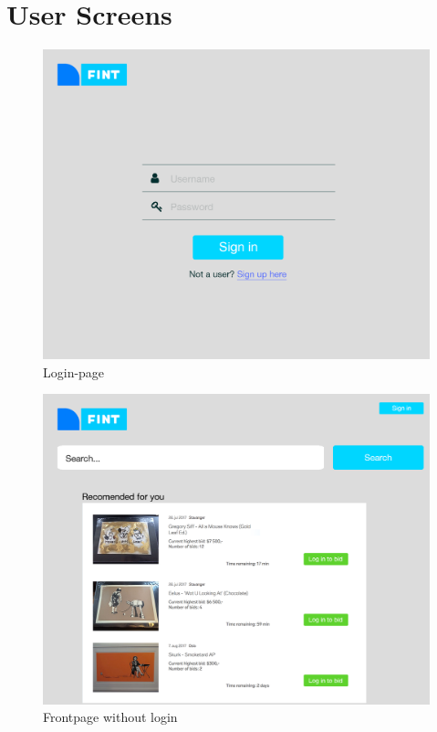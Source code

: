\section{User Screens	}
\begin{figure}[H]
  \caption{Login-page}
  \centering
    \includegraphics[scale=0.38]{figures/Login}
\end{figure}

\begin{figure}[H]
  \caption{Frontpage without login}
  \centering
    \includegraphics[scale=0.38]{figures/Frontpage}
\end{figure}

